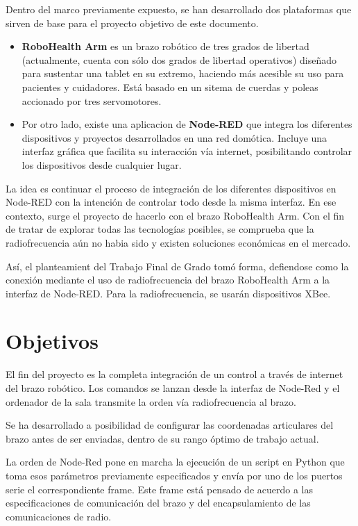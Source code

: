 Dentro del marco previamente expuesto, se han desarrollado dos plataformas que sirven de base para el proyecto objetivo de este documento.

\begin{itemize}
\item \textbf{RoboHealth Arm} es un brazo robótico de tres grados de libertad (actualmente, cuenta con sólo dos grados de libertad operativos) diseñado para sustentar una tablet en su extremo, haciendo más acesible su uso para pacientes y cuidadores. Está basado en un sitema de cuerdas y poleas accionado por tres servomotores.
\item Por otro lado, existe una aplicacion de \textbf{Node-RED} que integra los diferentes dispositivos y proyectos desarrollados en una red domótica. Incluye una interfaz gráfica que facilita su interacción vía internet, posibilitando controlar los dispositivos desde cualquier lugar.
\end{itemize} 

La idea es continuar el proceso de integración de los diferentes dispositivos en Node-RED con la intención de controlar todo desde la misma interfaz. En ese contexto, surge el proyecto de hacerlo con el brazo RoboHealth Arm. Con el fin de tratar de explorar todas las tecnologías posibles, se comprueba que la radiofrecuencia aún no habia sido y existen soluciones económicas en el mercado.

Así, el planteamient del Trabajo Final de Grado tomó forma, defiendose como la conexión mediante el uso de radiofrecuencia del brazo RoboHealth Arm a la interfaz de Node-RED. Para la radiofrecuencia, se usarán dispositivos XBee.

\section{Objetivos}

El fin del proyecto es la completa integración de un control a través de internet del brazo robótico. Los comandos se lanzan desde la interfaz de Node-Red y el ordenador de la sala transmite la orden vía radiofrecuencia al brazo.

Se ha desarrollado a posibilidad de configurar las coordenadas articulares del brazo antes de ser enviadas, dentro de su rango óptimo de trabajo actual.

La orden de Node-Red pone en marcha la ejecución de un script en Python que toma esos parámetros previamente especificados y envía por uno de los puertos serie el correspondiente frame. Este frame está pensado de acuerdo a las especificaciones de comunicación del brazo y del encapsulamiento de las comunicaciones de radio.

